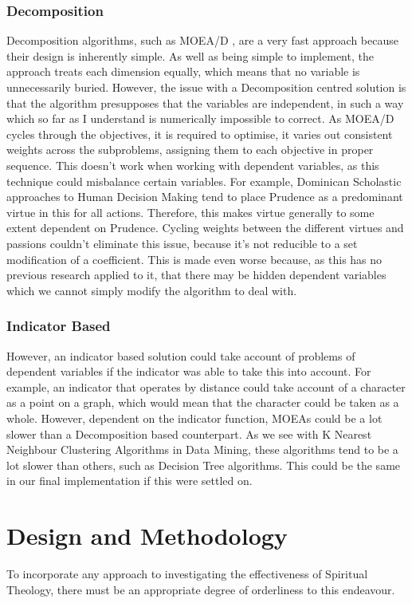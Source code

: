 \documentclass[12pt]{article}
\begin{document}
\subsubsection{Decomposition}
Decomposition algorithms, such as MOEA/D \cite{MOEAD}, are a very fast approach because their design is inherently simple. As well as being simple to implement, the approach treats each dimension equally, which means that no variable is unnecessarily buried. However, the issue with a Decomposition centred solution is that the algorithm presupposes that the variables are independent, in such a way which so far as I understand is numerically impossible to correct. As MOEA/D cycles through the objectives, it is required to optimise, it varies out consistent weights across the subproblems, assigning them to each objective in proper sequence. This doesn't work when working with dependent variables, as this technique could misbalance certain variables. For example, Dominican Scholastic approaches to Human Decision Making tend to place Prudence as a predominant virtue in this for all actions. Therefore, this makes virtue generally to some extent dependent on Prudence. Cycling weights between the different virtues and passions couldn't eliminate this issue, because it's not reducible to a set modification of a coefficient. This is made even worse because, as this has no previous research applied to it, that there may be hidden dependent variables which we cannot simply modify the algorithm to deal with.  \\
\subsubsection{Indicator Based} 
However, an indicator based solution could take account of problems of dependent variables if the indicator was able to take this into account. For example, an indicator that operates by distance could take account of a character as a point on a graph, which would mean that the character could be taken as a whole. However, dependent on the indicator function, MOEAs could be a lot slower than a Decomposition based counterpart. As we see with K Nearest Neighbour Clustering Algorithms in Data Mining\cite{CompareML}, these algorithms tend to be a lot slower than others, such as Decision Tree algorithms. This could be the same in our final implementation if this were settled on. \\

\section{Design and Methodology}
To incorporate any approach to investigating the effectiveness of Spiritual Theology, there must be an appropriate degree of orderliness to this endeavour.
\end{document}
